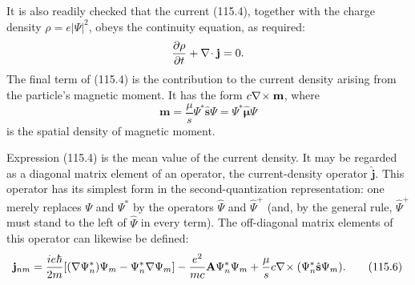 It is also readily checked that the current (115.4), together with the charge
density $\rho=e|\Psi|^2$, obeys the continuity equation, as required:
\[
 \frac{\partial\rho}{\partial t}+\nabla\!\cdot \mathbf j=0.
\]
The final term of (115.4) is the contribution to the current density arising
from the particle's magnetic moment. It has the form $c\nabla\!\times \mathbf m$, where
\begin{equation}
 \mathbf m=\frac\mu s\Psi^*\hat{\mathbf s}\Psi
 =\Psi^*\hat{\boldsymbol\mu}\Psi
 \tag{115.5}
\end{equation}
is the spatial density of magnetic moment.

Expression (115.4) is the mean value of the current density. It may be regarded
as a diagonal matrix element of an operator, the current-density operator
$\hat{\mathbf j}$. This operator has its simplest form in the
second-quantization representation: one merely replaces $\Psi$ and $\Psi^*$ by
the operators $\hat\Psi$ and $\hat\Psi^+$ (and, by the general rule,
$\hat\Psi^+$ must stand to the left of $\hat\Psi$ in every term). The
off-diagonal matrix elements of this operator can likewise be defined:
\begin{equation}
 \mathbf j_{nm}=\frac{ie\hbar}{2m}
 [ (\nabla\Psi_n^*)\Psi_m-\Psi_n^*\nabla\Psi_m]
 -\frac{e^2}{mc}\mathbf A\Psi_n^*\Psi_m
 +\frac\mu s c\nabla\!\times (\Psi_n^*\hat{\mathbf s}\Psi_m).
 \tag{115.6}
\end{equation}

